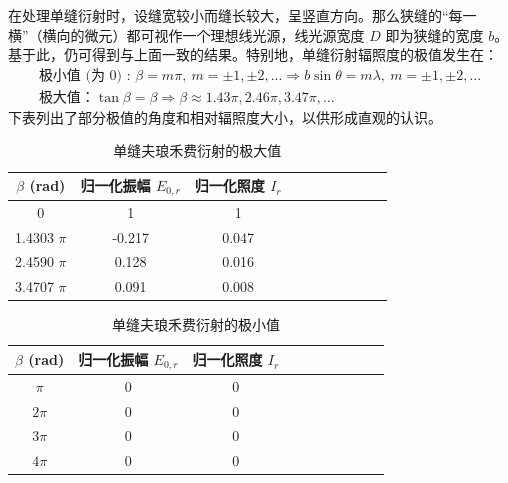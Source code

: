 \documentclass[UTF8]{article}
\theoremstyle{MyLineTheoremStyle} %
\theoremstyle{MyBlockTheoremStyle} %
\theoremstyle{MySubsubsectionStyle} %
\begin{document}
在处理单缝衍射时，设缝宽较小而缝长较大，呈竖直方向。那么狭缝的“每一横”（横向的微元）都可视作一个理想线光源，线光源宽度 $D$ 即为狭缝的宽度 $b$。基于此，仍可得到与上面一致的结果。特别地，单缝衍射辐照度的极值发生在：
\begin{gather}
\text{极小值 (为 0) : \ } \beta = m \pi,\ m = \pm 1, \pm 2, ... \Longrightarrow b \sin \theta = m \lambda,\ m = \pm 1, \pm 2, ... \\ 
\text{极大值：} \tan \beta = \beta \Longrightarrow \beta \approx 1.43 \pi, 2.46 \pi, 3.47 \pi, ...
\end{gather}
下表列出了部分极值的角度和相对辐照度大小，以供形成直观的认识。
\vspace*{-5mm}\begin{center}
\noindent\begin{minipage}{0.49\columnwidth}
    \begin{table}[H]\centering
        \caption{单缝夫琅禾费衍射的极大值}
        \label{单缝夫琅禾费衍射的极大值}
    \begin{tabular}{cccccccccc}\toprule
        $\beta$ (rad) & 归一化振幅 $E_{0, r}$ & 归一化照度 $I_r$ \\
        \midrule
        0            & 1      & 1      \\
        1.4303 $\pi$ & -0.217 & 0.047  \\
        2.4590 $\pi$ & 0.128  & 0.016  \\
        3.4707 $\pi$ & 0.091  & 0.008  \\
        \bottomrule
    \end{tabular}
    \end{table}
\end{minipage}\hfill\begin{minipage}{0.49\columnwidth}
    \begin{table}[H]\centering
        \caption{单缝夫琅禾费衍射的极小值}
        \label{单缝夫琅禾费衍射的极小值}
    \begin{tabular}{cccccccccc}\toprule
        $\beta$ (rad) & 归一化振幅 $E_{0, r}$ & 归一化照度 $I_r$ \\
        \midrule
        $\pi$  & 0 & 0 \\
        $2\pi$ & 0 & 0 \\
        $3\pi$ & 0 & 0 \\
        $4\pi$ & 0 & 0 \\
        \bottomrule
    \end{tabular}
    \end{table}
\end{minipage}\end{center}
\end{document}
